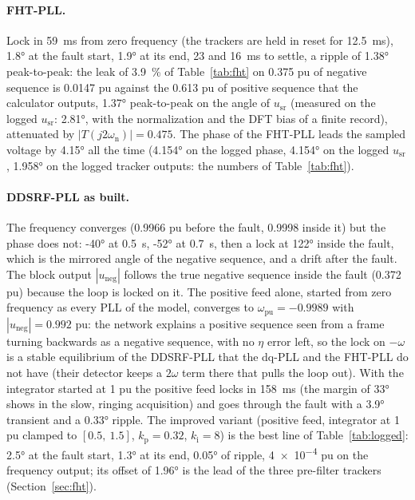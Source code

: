 \documentclass[11pt,a4paper]{scrartcl}
\newcommand{\ped}[1]{_{\mathrm{#1}}}
\begin{document}
\begin{onehalfspace}
\paragraph{FHT-PLL.} Lock in \SI{59}{\milli\second} from zero frequency (the trackers are held in reset for \SI{12.5}{\milli\second}), \ang{1.8} at the fault start, \ang{1.9} at its end, \SI{23}{} and \SI{16}{\milli\second} to settle, a ripple of \ang{1.38} peak-to-peak: the leak of \num{3.9}~\% of Table~\ref{tab:fht} on \num{0.375} pu of negative sequence is \num{0.0147} pu against the \num{0.613} pu of positive sequence that the calculator outputs, \ang{1.37} peak-to-peak on the angle of $u\ped{sr}$ (measured on the logged $u\ped{sr}$: \ang{2.81}, with the normalization and the DFT bias of a finite record), attenuated by $|T(j2\omega\ped{n})| = 0.475$. The phase of the FHT-PLL leads the sampled voltage by \ang{4.15} all the time (\ang{4.154} on the logged phase, \ang{4.154} on the logged $u\ped{sr}$, \ang{1.958} on the logged tracker outputs: the numbers of Table~\ref{tab:fht}).

\paragraph{DDSRF-PLL as built.} The frequency converges (\num{0.9966} pu before the fault, \num{0.9998} inside it) but the phase does not: \ang{-40} at \SI{0.5}{\second}, \ang{-52} at \SI{0.7}{\second}, then a lock at \ang{+122} inside the fault, which is the mirrored angle of the negative sequence, and a drift after the fault. The block output $|u\ped{neg}|$ follows the true negative sequence inside the fault (\num{0.372} pu) because the loop is locked on it. The positive feed alone, started from zero frequency as every PLL of the model, converges to $\omega\ped{pu} = -0.9989$ with $|u\ped{neg}| = 0.992$ pu: the network explains a positive sequence seen from a frame turning backwards as a negative sequence, with no $\eta$ error left, so the lock on $-\omega$ is a stable equilibrium of the DDSRF-PLL that the dq-PLL and the FHT-PLL do not have (their detector keeps a $2\omega$ term there that pulls the loop out). With the integrator started at \num{1} pu the positive feed locks in \SI{158}{\milli\second} (the margin of \ang{33} shows in the slow, ringing acquisition) and goes through the fault with a \ang{3.9} transient and a \ang{0.33} ripple. The improved variant (positive feed, integrator at \num{1} pu clamped to $[0.5,\ 1.5]$, $k\ped{p} = 0.32$, $k\ped{i} = 8$) is the best line of Table~\ref{tab:logged}: \ang{2.5} at the fault start, \ang{1.3} at its end, \ang{0.05} of ripple, \num{4e-4} pu on the frequency output; its offset of \ang{1.96} is the lead of the three pre-filter trackers (Section~\ref{sec:fht}).


\end{onehalfspace}
\end{document}
